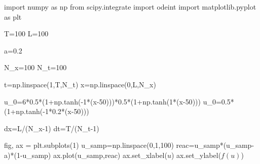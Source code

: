 \documentclass[
  letterpaper,
  DIV=11,
  numbers=noendperiod]{scrreprt}
\newenvironment{Shaded}{\begin{snugshade}}{\end{snugshade}}
\newcommand{\DecValTok}[1]{\textcolor[rgb]{0.68,0.00,0.00}{#1}}
\newcommand{\FloatTok}[1]{\textcolor[rgb]{0.68,0.00,0.00}{#1}}
\newcommand{\ImportTok}[1]{\textcolor[rgb]{0.00,0.46,0.62}{#1}}
\newcommand{\NormalTok}[1]{\textcolor[rgb]{0.00,0.23,0.31}{#1}}
\newcommand{\OperatorTok}[1]{\textcolor[rgb]{0.37,0.37,0.37}{#1}}
\newcommand{\StringTok}[1]{\textcolor[rgb]{0.13,0.47,0.30}{#1}}
\theoremstyle{plain}
\theoremstyle{definition}
\theoremstyle{plain}
\theoremstyle{remark}
\begin{document}
\begin{Shaded}
\begin{Highlighting}[]
\ImportTok{import}\NormalTok{ numpy }\ImportTok{as}\NormalTok{ np}
\ImportTok{from}\NormalTok{ scipy.integrate }\ImportTok{import}\NormalTok{ odeint}
\ImportTok{import}\NormalTok{ matplotlib.pyplot }\ImportTok{as}\NormalTok{ plt}

\NormalTok{T}\OperatorTok{=}\DecValTok{100}
\NormalTok{L}\OperatorTok{=}\DecValTok{100}

\NormalTok{a}\OperatorTok{=}\FloatTok{0.2}

\NormalTok{N\_x}\OperatorTok{=}\DecValTok{100}
\NormalTok{N\_t}\OperatorTok{=}\DecValTok{100}

\NormalTok{t}\OperatorTok{=}\NormalTok{np.linspace(}\DecValTok{1}\NormalTok{,T,N\_t)}
\NormalTok{x}\OperatorTok{=}\NormalTok{np.linspace(}\DecValTok{0}\NormalTok{,L,N\_x)}


\NormalTok{u\_0}\OperatorTok{=}\DecValTok{6}\OperatorTok{*}\FloatTok{0.5}\OperatorTok{*}\NormalTok{(}\DecValTok{1}\OperatorTok{+}\NormalTok{np.tanh(}\OperatorTok{{-}}\DecValTok{1}\OperatorTok{*}\NormalTok{(x}\OperatorTok{{-}}\DecValTok{50}\NormalTok{)))}\OperatorTok{*}\FloatTok{0.5}\OperatorTok{*}\NormalTok{(}\DecValTok{1}\OperatorTok{+}\NormalTok{np.tanh(}\DecValTok{1}\OperatorTok{*}\NormalTok{(x}\OperatorTok{{-}}\DecValTok{50}\NormalTok{)))}
\NormalTok{u\_0}\OperatorTok{=}\FloatTok{0.5}\OperatorTok{*}\NormalTok{(}\DecValTok{1}\OperatorTok{+}\NormalTok{np.tanh(}\OperatorTok{{-}}\DecValTok{1}\OperatorTok{*}\FloatTok{0.2}\OperatorTok{*}\NormalTok{(x}\OperatorTok{{-}}\DecValTok{50}\NormalTok{)))}

\NormalTok{dx}\OperatorTok{=}\NormalTok{L}\OperatorTok{/}\NormalTok{(N\_x}\OperatorTok{{-}}\DecValTok{1}\NormalTok{)}
\NormalTok{dt}\OperatorTok{=}\NormalTok{T}\OperatorTok{/}\NormalTok{(N\_t}\OperatorTok{{-}}\DecValTok{1}\NormalTok{)}

\NormalTok{fig, ax }\OperatorTok{=}\NormalTok{ plt.subplots(}\DecValTok{1}\NormalTok{)}
\NormalTok{u\_samp}\OperatorTok{=}\NormalTok{np.linspace(}\DecValTok{0}\NormalTok{,}\DecValTok{1}\NormalTok{,}\DecValTok{100}\NormalTok{)}
\NormalTok{reac}\OperatorTok{=}\NormalTok{u\_samp}\OperatorTok{*}\NormalTok{(u\_samp}\OperatorTok{{-}}\NormalTok{a)}\OperatorTok{*}\NormalTok{(}\DecValTok{1}\OperatorTok{{-}}\NormalTok{u\_samp)}
\NormalTok{ax.plot(u\_samp,reac) }
\NormalTok{ax.set\_xlabel(}\StringTok{\textquotesingle{}$u$\textquotesingle{}}\NormalTok{)}
\NormalTok{ax.set\_ylabel(}\StringTok{\textquotesingle{}$f(u)$\textquotesingle{}}\NormalTok{)}


\end{Highlighting}
\end{Shaded}
\end{document}
